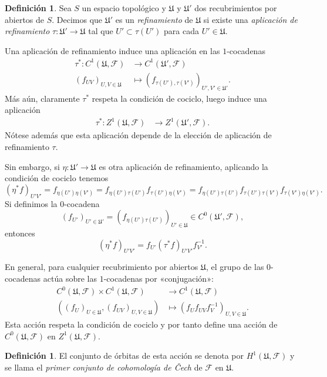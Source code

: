 \documentclass[12pt,a4paper]{article}
\theoremstyle{definition} \newtheorem{defn}[thm]{Definición}
\theoremstyle{definition} \newtheorem{ejemplo}[thm]{Ejemplo}
\theoremstyle{definition} \newtheorem{ejercicio}[thm]{Ejercicio}
\def\FF{\mathscr{F}}
\def\UU{\mathfrak{U}}
\begin{document}
    \begin{defn}
      Sea $S$ un espacio topológico y $\UU$ y $\UU'$ dos recubrimientos por abiertos de $S$. Decimos que $\UU'$ es un \emph{refinamiento} de $\UU$ si existe una \emph{aplicación de refinamiento} $\tau:\UU' \rightarrow \UU$ tal que $U'\subset \tau(U')$ para cada $U'\in \UU$.
    \end{defn}

    Una aplicación de refinamiento induce una aplicación en las $1$-cocadenas
    \begin{align*}
      \tau^* :C^1(\UU,\FF)&\longrightarrow C^1(\UU',\FF) \\ 
      (f_{U V})_{U,V \in \UU} &\longmapsto (f_{\tau(U'),\tau(V')})_{U',V' \in \UU'}. 
      \end{align*}
      Más aún, claramente $\tau^*$ respeta la condición de cociclo, luego induce una aplicación
      \begin{align*}
	\tau^* :Z^1(\UU,\FF) &\longrightarrow Z^1(\UU',\FF). 
	\end{align*}
	Nótese además que esta aplicación depende de la elección de aplicación de refinamiento $\tau$. 
	
	Sin embargo, si $\eta:\UU'\rightarrow \UU$ es otra aplicación de refinamiento, aplicando la condición de cociclo tenemos
	\begin{equation*}
	  (\eta^* f)_{U'V'} = f_{\eta(U') \eta(V')} = f_{\eta(U') \tau(U')} f_{\tau(U') \eta(V')} =f_{\eta(U') \tau(U')} f_{\tau(U') \tau(V')}f_{\tau(V') \eta(V')}.
	\end{equation*}
	Si definimos la $0$-cocadena $$(f_{U'})_{U'\in \UU'}= (f_{\eta(U')\tau(U')})_{U'\in \UU} \in C^0(\UU',\FF),$$
	entonces
	\begin{equation*}
	  (\eta^* f)_{U'V'} = f_{U'} (\tau^* f)_{U'V'} f_{V'}^{-1}.
	\end{equation*}

	En general, para cualquier recubrimiento por abiertos $\UU$, el grupo de las $0$-cocadenas actúa sobre las $1$-cocadenas por «conjugación»:
	\begin{align*}
	   C^0(\UU,\FF) \times C^1(\UU, \FF) &\longrightarrow C^1(\UU, \FF) \\ 
	   ( (f_U)_{U\in \UU}, (f_{UV})_{U,V \in \UU} )  &\longmapsto ( f_U f_{UV} f_V^{-1} )_{U,V \in \UU}. 
	  \end{align*}
	  Esta acción respeta la condición de cociclo y por tanto define una acción de $C^0(\UU,\FF)$ en $Z^1(\UU,\FF)$.

	  \begin{defn}
	    El conjunto de órbitas de esta acción se denota por $H^1(\UU,\FF)$ y se llama el \emph{primer conjunto de cohomología de \v{C}ech} de $\FF$ en $\UU$.
	  \end{defn}
\end{document}
